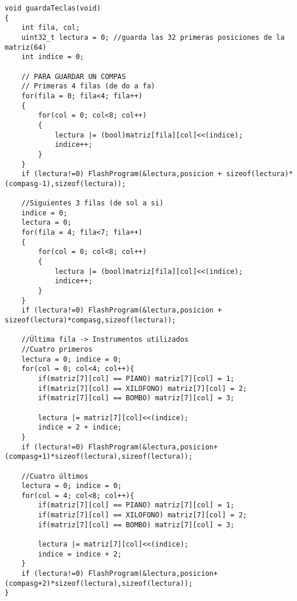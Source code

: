 \documentclass[12pt,a4paper]{article}
\begin{document}
\begin{lstlisting}[basicstyle=\footnotesize] 
void guardaTeclas(void)
{
    int fila, col;
    uint32_t lectura = 0; //guarda las 32 primeras posiciones de la matriz(64)
    int indice = 0;

    // PARA GUARDAR UN COMPAS
    // Primeras 4 filas (de do a fa)
    for(fila = 0; fila<4; fila++)
    {
        for(col = 0; col<8; col++)
        {
            lectura |= (bool)matriz[fila][col]<<(indice);
            indice++;
        }
    }
    if (lectura!=0) FlashProgram(&lectura,posicion + sizeof(lectura)*(compasg-1),sizeof(lectura));

    //Siguientes 3 filas (de sol a si)
    indice = 0;
    lectura = 0;
    for(fila = 4; fila<7; fila++)
    {
        for(col = 0; col<8; col++)
        {
            lectura |= (bool)matriz[fila][col]<<(indice);
            indice++;
        }
    }
    if (lectura!=0) FlashProgram(&lectura,posicion + sizeof(lectura)*compasg,sizeof(lectura));

    //Última fila -> Instrumentos utilizados
    //Cuatro primeros
    lectura = 0; indice = 0;
    for(col = 0; col<4; col++){
        if(matriz[7][col] == PIANO) matriz[7][col] = 1;
        if(matriz[7][col] == XILOFONO) matriz[7][col] = 2;
        if(matriz[7][col] == BOMBO) matriz[7][col] = 3;

        lectura |= matriz[7][col]<<(indice);
        indice = 2 + indice;
    }
    if (lectura!=0) FlashProgram(&lectura,posicion+(compasg+1)*sizeof(lectura),sizeof(lectura));

    //Cuatro últimos
    lectura = 0; indice = 0;
    for(col = 4; col<8; col++){
        if(matriz[7][col] == PIANO) matriz[7][col] = 1;
        if(matriz[7][col] == XILOFONO) matriz[7][col] = 2;
        if(matriz[7][col] == BOMBO) matriz[7][col] = 3;

        lectura |= matriz[7][col]<<(indice);
        indice = indice + 2;
    }
    if (lectura!=0) FlashProgram(&lectura,posicion+(compasg+2)*sizeof(lectura),sizeof(lectura));
}
\end{lstlisting}
\end{document}
